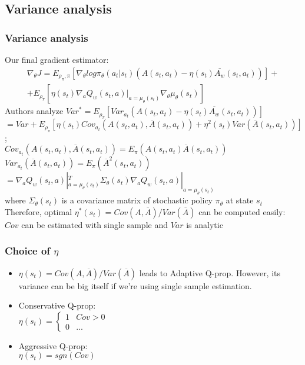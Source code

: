 \documentclass{beamer}
\begin{document}
\subsection{Variance analysis}
\begin{frame}[t]
\frametitle{Variance analysis}
Our final gradient estimator:
\begin{multline}
\nabla_{\theta} J = E_{\rho_\pi, \pi} \left[ \nabla_{\theta} log \pi_\theta ( a_t | s_t) (A(s_t, a_t) - \eta(s_t) \overline{A_w} (s_t,a_t)) \right] + \\ + E_{\rho_\pi} \left[ \eta(s_t) \nabla_a Q_w(s_t, a) |_{a=\mu_\theta(s_t)} 
\nabla_\theta \mu_\theta(s_t)
\right]
\end{multline}
Authors analyze $Var^* = E_{\rho_\pi} \left[ Var_{a_t}(A(s_t,a_t) - \eta(s_t) \overline{A_w} (s_t,a_t) )\right]$
\\ $=Var + E_{\rho_\pi} \left[ \eta(s_t) Cov_{a_t} (A(s_t, a_t), \overline{A}(s_t, a_t)) + \eta^2(s_t) Var(\overline{A}(s_t, a_t)) \right]$;
\\ $Cov_{a_t} (A(s_t, a_t), \overline{A}(s_t, a_t)) = E_\pi (A(s_t,a_t) \overline{A}(s_t, a_t))$
\\ $Var_{a_t} (\overline{A}(s_t, a_t)) = E_\pi (\overline{A}^2(s_t, a_t))$
\\ $= \nabla_a Q_w(s_t, a) |_{a=\mu_\theta(s_t)}^T \Sigma_\theta(s_t) \nabla_a Q_w(s_t, a) |_{a=\mu_\theta(s_t)}$
\\ where $\Sigma_\theta(s_t)$ is a covariance matrix of stochastic policy $\pi_\theta$ at state $s_t$
\\ Therefore, optimal $\eta^*(s_t) = Cov(A,\overline{A})/Var(\overline{A})$ can be computed easily: $Cov$ can be estimated with single sample and $Var$ is analytic


\end{frame}

\begin{frame}[t]
\frametitle{Choice of $\eta$}
\begin{itemize}
\item $\eta(s_t) = Cov(A,\overline{A})/Var(\overline{A})$ leads to Adaptive Q-prop. However, its variance can be big itself if we're using single sample estimation.
\item Conservative Q-prop: \\
$\eta(s_t) =
	\begin{cases}
		1 & \text{$Cov > 0$}\\
		0 & \text{...}
	\end{cases}$
\item Aggressive Q-prop: \\
$\eta(s_t) = sgn(Cov)$
	

\end{itemize}

\end{frame}
\end{document}
